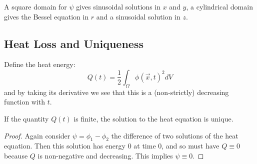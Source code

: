 \documentclass[../Main.tex]{subfiles}
\begin{document}
A square domain for $\psi$ gives sinusoidal solutions in $x$ and $y$, a cylindrical domain gives the Bessel equation in $r$ and a sinusoidal solution in $z$.
\subsection{Heat Loss and Uniqueness}
Define the heat energy:
\begin{equation*}
    Q(t) = \frac12 \int_{\Omega} \phi(\vec{x}, t)^2 dV
\end{equation*}
and by taking its derivative we see that this is a (non-strictly) decreasing function with $t$.

\begin{proposition}
    If the quantity $Q(t)$ is finite, the solution to the heat equation is unique.
    \label{propHeatUnique}
\end{proposition}
\begin{proof}
    Again consider $\psi = \phi_1 - \phi_2$ the difference of two solutions of the heat equation. Then this solution has energy $0$ at time $0$, and so must have $Q \equiv 0$ because $Q$ is non-negative and decreasing. This implies $\psi \equiv 0$.
\end{proof}
\end{document}
